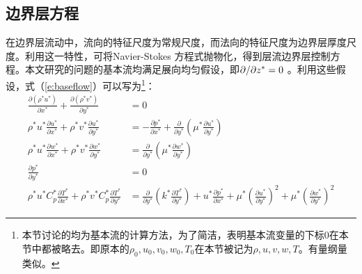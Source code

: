 \subsection{边界层方程}\label{subsec:BLfun}
在边界层流动中，流向的特征尺度为常规尺度，而法向的特征尺度为边界层厚度尺度。利用这一特性，可将Navier-Stokes 方程式抛物化，得到层流边界层控制方程。本文研究的问题的基本流均满足展向均匀假设，即${\partial}/{\partial z^*}=0$ 。利用这些假设，式（\ref{e:baseflow}）可以写为\footnote{本节讨论的均为基本流的计算方法，为了简洁，表明基本流变量的下标0在本节中都被略去。即原本的$\rho_0,u_0,v_0,w_0,T_0$在本节被记为$\rho,u,v,w,T$。有量纲量类似。}：
\begin{subequations}
\begin{align}
\frac{{\partial \left( {\rho^* u^*} \right)}}{{\partial x^* }} + \frac{{\partial \left( {\rho^* v^*} \right)}}{{\partial y^* }} &= 0 \\
\rho ^* u^* \frac{{\partial u^* }}{{\partial x^* }} + \rho ^* v^* \frac{{\partial u^* }}{{\partial y^* }} &=  - \frac{{\partial p^* }}{{\partial x^* }} + \frac{\partial }{{\partial y^* }}\left( {\mu ^* \frac{{\partial u^* }}{{\partial y^* }}} \right)\\
\rho ^* u^* \frac{{\partial w^* }}{{\partial x^* }} + \rho ^* v^* \frac{{\partial w^* }}{{\partial y^* }} &= \frac{\partial }{{\partial y^* }}\left( {\mu ^* \frac{{\partial w^* }}{{\partial y^* }}} \right)\\
\frac{{\partial p^* }}{{\partial y^* }} &= 0\\
\rho ^* u^* C_p^* \frac{{\partial T^* }}{{\partial x^* }} + \rho ^* v^* C_p^* \frac{{\partial T^* }}{{\partial y^* }} &= \frac{\partial }{{\partial y^* }}\left( {k^* \frac{{\partial T^* }}{{\partial y^* }}} \right) + u^* \frac{{\partial p^* }}{{\partial x^* }} + \mu ^* \left( {\frac{{\partial u^* }}{{\partial y^* }}} \right)^2  + \mu ^* \left( {\frac{{\partial w^* }}{{\partial y^* }}} \right)^2
\end{align}
\end{subequations}

